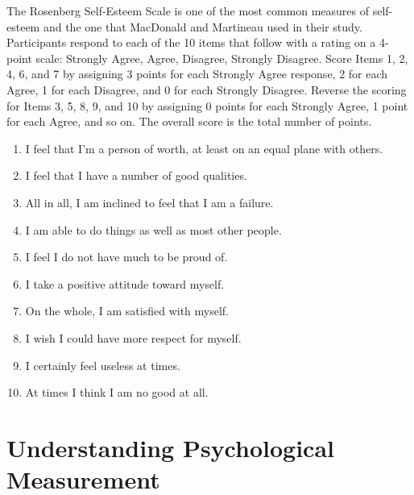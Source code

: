 \color{fgcolor}
\begin{kframe}




The Rosenberg Self-Esteem Scale \citep{rosenberg_society_1965} is one of the most common measures of self-esteem and the one that MacDonald and Martineau used in their study. Participants respond to each of the 10 items that follow with a rating on a 4-point scale: Strongly Agree, Agree, Disagree, Strongly Disagree. Score Items 1, 2, 4, 6, and 7 by assigning 3 points for each Strongly Agree response, 2 for each Agree, 1 for each Disagree, and 0 for each Strongly Disagree. Reverse the scoring for Items 3, 5, 8, 9, and 10 by assigning 0 points for each Strongly Agree, 1 point for each Agree, and so on. The overall score is the total number of points.

\begin{enumerate}
\item 
I feel that I'm a person of worth, at least on an equal plane with others. 

\item I feel that I have a number of good qualities.

\item All in all, I am inclined to feel that I am a failure.

\item I am able to do things as well as most other people.

\item I feel I do not have much to be proud of.

\item I take a positive attitude toward myself.

\item  On the whole, I am satisfied with myself.

\item I wish I could have more respect for myself. 

\item I certainly feel useless at times.
 \item At times I think I am no good at all.
\end{enumerate}
 \end{kframe}
 
 \color{fgcolor}
 
 
\section{Understanding Psychological Measurement}

